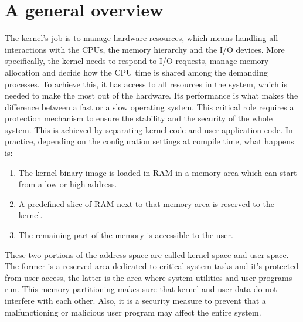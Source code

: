 \section{A general overview} 
\label{sec:general}
The kernel's job is to manage hardware resources, which means handling all interactions with the CPUs, the memory hierarchy and the I/O devices. More specifically, the kernel needs to respond to I/O requests, manage memory allocation and decide how the CPU time is shared among the demanding processes. To achieve this, it has access to all resources in the system, which is needed to make the most out of the hardware. Its performance is what makes the difference between a fast or a slow operating system. This critical role requires a protection mechanism to ensure the stability and the security of the whole system. This is achieved by separating kernel code and user application code. In practice, depending on the configuration settings at compile time, what happens is: 
\begin{enumerate}
    \item The kernel binary image is loaded in RAM in a memory area which can start from a low or high address.
    \item A predefined slice of RAM next to that memory area is reserved to the kernel. 
    \item The remaining part of the memory is accessible to the user.
\end{enumerate}
These two portions of the address space %
are called kernel space and user space. The former is a reserved area dedicated to critical system tasks and it's protected from user access, the latter is the area where system utilities and user programs run. This memory partitioning makes sure that kernel and user data do not interfere with each other. Also, it is a security measure to prevent that a malfunctioning or malicious user program may affect the entire system.

